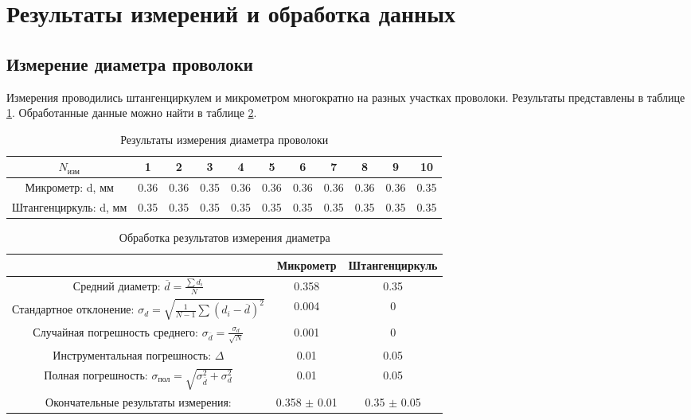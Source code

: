 \documentclass[a4paper,12pt]{article} %
\begin{document}
\section{Результаты измерений и обработка данных}
\subsection{Измерение диаметра проволоки}
Измерения проводились штангенциркулем и микрометром многократно на разных участках проволоки. Результаты представлены в таблице \ref{Диаметр}. Обработанные данные можно найти в таблице \ref{Диаметробр}.
\begin{table}
\label{Диаметр}
\caption{Результаты измерения диаметра проволоки}
\begin{tabular}{|c|c|c|c|c|c|c|c|c|c|c|}
\hline 
$N_{\text{изм}}$ & 1 & 2 & 3 & 4 & 5 & 6 & 7 & 8 & 9 & 10 \\ 
\hline 
Микрометр: d, мм & 0.36 & 0.36 & 0.35 & 0.36 & 0.36 & 0.36 & 0.36 & 0.36 & 0.36 & 0.35 \\ 
\hline 
Штангенциркуль: d, мм & 0.35 & 0.35 & 0.35 & 0.35 & 0.35 & 0.35 & 0.35 & 0.35 & 0.35 & 0.35 \\ 
\hline 
\end{tabular} 
\end{table}

\begin{table}
\caption{Обработка результатов измерения диаметра}
\label{Диаметробр}
\begin{tabular}{|c|c|c|}
\hline 
 & Микрометр & Штангенциркуль \\ 
\hline 
Средний диаметр: $\overline{d}=\frac{\sum d_i}{N}$ & 0.358 & 0.35 \\ 
\hline 
Стандартное отклонение: $\sigma_d=\sqrt{\frac{1}{N-1}\sum (d_i-\overline{d})^2}$ & 0.004&0 \\ 
\hline 
Случайная погрешность среднего: $\sigma_{\overline{d}}=\frac{\sigma_d}{\sqrt{N}}$ & 0.001 & 0 \\ 
\hline 
Инструментальная погрешность: $\Delta$ & 0.01 & 0.05 \\ 
\hline 
Полная погрешность: $\sigma_{\text{пол}}=\sqrt{\sigma_{\overline{d}}^2+\sigma_d^2}$ & 0.01 & 0.05 \\ 
\hline 
Окончательные результаты измерения:  & 0.358 $\pm$ 0.01 & 0.35 $\pm$ 0.05 \\
\hline 
\end{tabular} 
\end{table}
\end{document}
